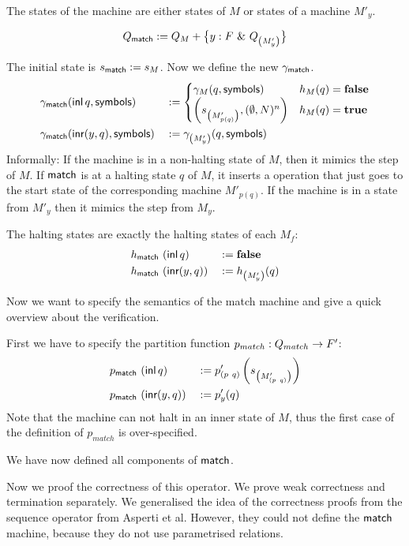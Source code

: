 \documentclass{psartcl}
\begin{document}
The states of the machine are either states of $M$ or states of a machine $M'_y$.

$$Q_{\textsf{match}} := Q_M + \bigl\{ y:F~{\&}~Q_{ \left( M'_{y} \right) } \bigr \}$$

The initial state is $s_{\textsf{match}} := s_M$.  Now we define the new $\gamma_{\textsf{match}}$.
\begin{alignat*}{2}
  \gamma_{\textsf{match}} & (\operatorname{\textsf{inl}} q, \textsf{symbols}) &&:=
  \begin{cases}
    \gamma_{M}(q, \textsf{symbols})                                & h_M(q) = \mathbf{false} \\
    \left( s_{\left(M'_{p(q)}\right)}, (\emptyset, N)^n \right)  & h_M(q) = \mathbf{true}
  \end{cases} \\
  \gamma_{\textsf{match}} & (\operatorname{\textsf{inr}} (y, q), \textsf{symbols}) &&:= \gamma_{\left({M'_y}\right)}(q, \textsf{symbols})
\end{alignat*}
Informally:  If the machine is in a non-halting state of $M$, then it mimics the step of $M$.  If $\textsf{match}$ is at a halting state $q$ of $M$, it
inserts a operation that just goes to the start state of the corresponding machine $M'_{p(q)}$.  If the machine is in a state from $M'_y$ then it
mimics the step from $M_y$.

The halting states are exactly the halting states of each $M_f$:
\begin{alignat*}{3}
  h_{\textsf{match}} &~ (\operatorname{\textsf{inl}}      q) &&:= \mathbf{false} \\
  h_{\textsf{match}} &~ (\operatorname{\textsf{inr}} (y, q)) &&:= h_{\left( M'_y \right)}(q)
\end{alignat*}

Now we want to specify the semantics of the match machine and give a quick overview about the verification.

First we have to specify the partition function $p_{match} : Q_{match} \rightarrow F'$:
\begin{alignat*}{3}
  p_{\textsf{match}} &~ (\operatorname{\textsf{inl}}      q) &&:= p'_{\left({p~q}\right)} \left( s_{ \left( M'_{ \left( p~q \right) } \right) } \right) \\
  p_{\textsf{match}} &~ (\operatorname{\textsf{inr}} (y, q)) &&:= p'_y(q)
\end{alignat*}
Note that the machine can not halt in an inner state of $M$, thus the first case of the definition of $p_{match}$ is over-specified.

We have now defined all components of $\textsf{match}$.

Now we proof the correctness of this operator.  We prove weak correctness and termination separately.
We generalised the idea of the correctness proofs from the sequence operator from Asperti et al.
However, they could not define the $\textsf{match}$ machine, because they do not use parametrised relations.
\end{document}
